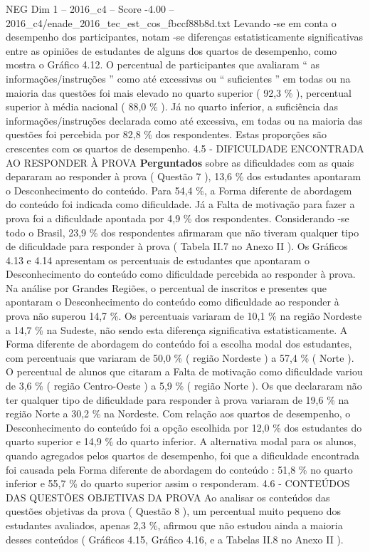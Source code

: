 \begin{textsample}{NEG Dim 1 – 2016\_c4 – Score -4.00 – 2016\_c4/enade\_2016\_tec\_est\_cos\_fbccf88b8d.txt}
Levando -se em conta o desempenho dos participantes, notam -se diferenças estatisticamente significativas entre as opiniões de estudantes de alguns dos quartos de desempenho, como mostra o Gráfico 4.12.
O percentual de participantes que avaliaram “ as informações/instruções ” como até excessivas ou “ suficientes ” em todas ou na maioria das questões foi mais elevado no quarto superior ( 92,3 \% ), percentual superior à média nacional ( 88,0 \% ).
Já no quarto inferior, a suficiência das informações/instruções declarada como até excessiva, em todas ou na maioria das questões foi percebida por 82,8 \% dos respondentes.
Estas proporções são crescentes com os quartos de desempenho. 4.5 - DIFICULDADE ENCONTRADA AO RESPONDER À PROVA \textbf{Perguntados} sobre as dificuldades com as quais depararam ao responder à prova ( Questão 7 ), 13,6 \% dos estudantes apontaram o Desconhecimento do conteúdo.
Para 54,4 \%, a Forma diferente de abordagem do conteúdo foi indicada como dificuldade.
Já a Falta de motivação para fazer a prova foi a dificuldade apontada por 4,9 \% dos respondentes.
Considerando -se todo o Brasil, 23,9 \% dos respondentes afirmaram que não tiveram qualquer tipo de dificuldade para responder à prova ( Tabela II.7 no Anexo II ).
Os Gráficos 4.13 e 4.14 apresentam os percentuais de estudantes que apontaram o Desconhecimento do conteúdo como dificuldade percebida ao responder à prova.
Na análise por Grandes Regiões, o percentual de inscritos e presentes que apontaram o Desconhecimento do conteúdo como dificuldade ao responder à prova não superou 14,7 \%.
Os percentuais variaram de 10,1 \% na região Nordeste a 14,7 \% na Sudeste, não sendo esta diferença significativa estatisticamente.
A Forma diferente de abordagem do conteúdo foi a escolha modal dos estudantes, com percentuais que variaram de 50,0 \% ( região Nordeste ) a 57,4 \% ( Norte ).
O percentual de alunos que citaram a Falta de motivação como dificuldade variou de 3,6 \% ( região Centro-Oeste ) a 5,9 \% ( região Norte ).
Os que declararam não ter qualquer tipo de dificuldade para responder à prova variaram de 19,6 \% na região Norte a 30,2 \% na Nordeste.
Com relação aos quartos de desempenho, o Desconhecimento do conteúdo foi a opção escolhida por 12,0 \% dos estudantes do quarto superior e 14,9 \% do quarto inferior.
A alternativa modal para os alunos, quando agregados pelos quartos de desempenho, foi que a dificuldade encontrada foi causada pela Forma diferente de abordagem do conteúdo : 51,8 \% no quarto inferior e 55,7 \% do quarto superior assim o responderam. 4.6 - CONTEÚDOS DAS QUESTÕES OBJETIVAS DA PROVA Ao analisar os conteúdos das questões objetivas da prova ( Questão 8 ), um percentual muito pequeno dos estudantes avaliados, apenas 2,3 \%, afirmou que não estudou ainda a maioria desses conteúdos ( Gráficos 4.15, Gráfico 4.16, e a Tabelas II.8 no Anexo II ).

\end{textsample}
